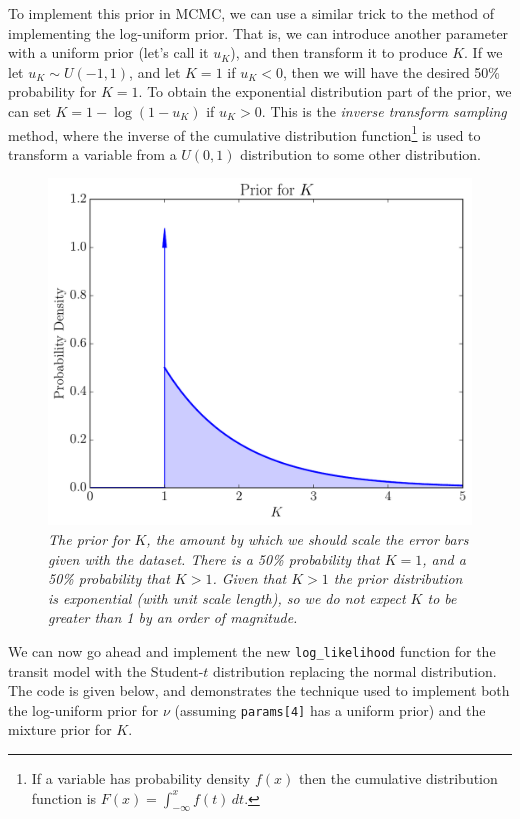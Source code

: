 To implement this
prior in MCMC, we can use a similar trick to the method of implementing the
log-uniform prior. That is, we can introduce another parameter
with a uniform prior (let's call it $u_K$),
and then transform it to produce $K$. If we let
$u_K \sim U(-1, 1)$, and let $K=1$ if $u_K < 0$, then we will have the desired
50\% probability for $K=1$. To obtain the exponential distribution part of the
prior, we can set $K = 1 - \log(1 - u_K)$ if $u_K > 0$. This is the
{\it inverse transform sampling} method, where the inverse of the cumulative
distribution function\footnote{If a variable has probability density $f(x)$
then the cumulative distribution function is
$F(x) = \int_{-\infty}^x f(t) \, dt$.}
is used to transform a variable from a $U(0, 1)$
distribution to some other distribution.

\begin{figure}
\begin{center}
\includegraphics[scale=0.45]{delta_mixture.pdf}
\caption{\it The prior for $K$, the amount by which we should scale the error
bars given with the dataset. There is a 50\% probability that $K=1$, and
a 50\% probability that $K > 1$. Given that $K > 1$ the prior distribution
is exponential (with unit scale length), so we do not expect $K$ to be
greater than 1 by an order of magnitude.\label{fig:delta_mixture}}
\end{center}
\end{figure}

We can now go ahead and implement the new {\tt log\_likelihood} function for
the transit model with the Student-$t$ distribution replacing the normal
distribution. The code is given below, and demonstrates the technique used to
implement both the log-uniform prior for $\nu$ (assuming {\tt params[4]} has
a uniform prior) and the mixture prior for $K$.

